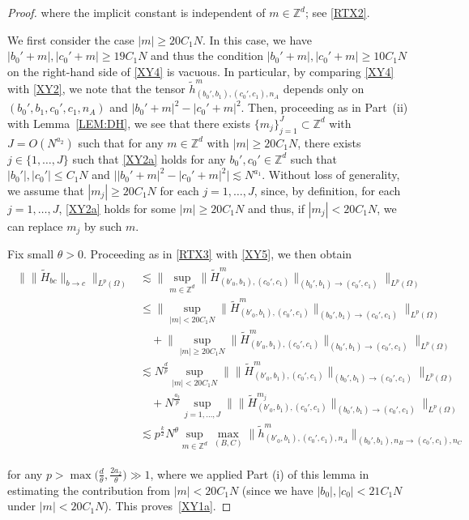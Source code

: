 \documentclass[%
11pt,  reqno]{amsart}
\newcommand{\1}{\hspace{0.2mm}\text{I}\hspace{0.2mm}}
\newcommand{\noi}{\noindent}
\newcommand{\Z}{\mathbb{Z}}
\newcommand{\wt}{\widetilde}
\newcommand{\ta}{\theta}
\renewcommand{\O}{\Omega}
\newcommand{\les}{\lesssim}
\numberwithin{equation}{section}
\numberwithin{theorem}{section}
\begin{document}
\begin{proof}
\noi
where the implicit constant is independent of $m \in \Z^d$; 
see \eqref{RTX2}.

We first consider the case $|m| \ge 20 C_1N$.
In this case, 
we have 
$|b_0'+m|, |c_0'+m| \ge 19 C_1 N $
and thus the condition 
$|b_0'+m|, |c_0'+m| \ge 10C_1 N$
on the right-hand side of  \eqref{XY4} is vacuous.
In particular, 
by comparing \eqref{XY4} with \eqref{XY2}, we
note  that 
the tensor $\wt h^m_{(b_0', b_1), (c_0', c_1), n_A}$ 
depends only on  $(b_0',b_1, c_0', c_1, n_A)$ and 
$|b_0'+m|^2 - |c_0'+m|^2$.
Then, proceeding as in Part~(ii) with 
Lemma~\ref{LEM:DH}, 
we see that there exists $\{m_j\}_{j=1}^J \subset \Z^d $ with $J =O(N^{a_2})$ 
such that for any $m \in \Z^d$
with $|m| \ge 20 C_1N$, 
 there exists $j \in \{1, \dots, J\}$ such that \eqref{XY2a} holds
for any  $b_0',c_0' \in \Z^d $ such that $|b_0'|, |c_0'| \le C_1 N$ and 
$\big||b_0'+m|^2 - |c_0'+m|^2\big| \les N^{a_1}$.
Without loss of generality, 
we assume that $|m_j| \ge 20 C_1 N$ for each $j = 1, \dots, J$, 
since, by definition, for each $j = 1, \dots, J$,
\eqref{XY2a} holds for some $|m|\ge 20 C_1 N$
and thus, if $|m_j| <  20 C_1 N$, 
we can replace $m_j$ by such $m$.




Fix small $\ta > 0$.
Proceeding as in \eqref{RTX3}
with \eqref{XY5}, we then obtain
\begin{align}
\begin{split}
\big\| \| \wt H_{bc} \|_{b \to c} \big\|_{L^p(\O)}  
& \les \Big\| \sup_{m \in \Z^d} 
 \| \wt H_{(b'_0, b_1), (c_0', c_1)}^m \|_{(b_0', b_1) \to (c_0', c_1)}  \Big\|_{L^p(\O)} \\
& \le \Big\| \sup_{|m| < 20 C_1 N}
 \| \wt H_{(b'_0, b_1), (c_0', c_1)}^m \|_{(b_0', b_1) \to (c_0', c_1)}  \Big\|_{L^p(\O)} \\
& \quad 
+  \Big\| \sup_{|m| \ge  20 C_1 N} 
 \| \wt H_{(b'_0, b_1), (c_0', c_1)}^m \|_{(b_0', b_1) \to (c_0', c_1)}  \Big\|_{L^p(\O)} \\
& \les
N^{\frac{d}{p}}
 \sup_{|m| < 20 C_1 N}
  \big\|  
   \| \wt H_{(b'_0, b_1), (c_0', c_1)}^{m} \|_{(b_0', b_1) \to (c_0', c_1)}  \big\|_{L^p(\O)} \\
& \quad + 
N^{\frac{a_2}{p}}
\sup_{j = 1, \dots, J}
  \big\|  
   \| \wt H_{(b'_0, b_1), (c_0', c_1)}^{m_j} \|_{(b_0', b_1) \to (c_0', c_1)}  \big\|_{L^p(\O)} \\
 & \les
 p^{\frac k2} N^{\theta}
\sup_{m \in \Z^d}
  \max_{(B,C)} \|
\wt h^m_{(b'_0, b_1), (c_0', c_1), n_A} \|_{(b_0', b_1), n_B \to (c_0', c_1),  n_C}
\end{split}
\label{XY6}
 \end{align}

\noi
for any $p >  \max\big( \frac d\ta,  \frac{2a_2}{\ta}\big) \gg 1$, 
where we applied Part (i) of this lemma in 
estimating the contribution from $|m|< 20 C_1 N$
(since 
we have 
 $|b_0|, |c_0| < 21 C_1 N$ under 
$|m|< 20 C_1 N$).
This proves~\eqref{XY1a}.
\end{proof}
\end{document}
